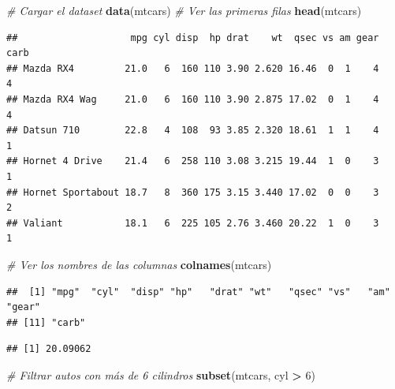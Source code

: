 \documentclass[
]{article}
\newenvironment{Shaded}{\begin{snugshade}}{\end{snugshade}}
\newcommand{\CommentTok}[1]{\textcolor[rgb]{0.56,0.35,0.01}{\textit{#1}}}
\newcommand{\DecValTok}[1]{\textcolor[rgb]{0.00,0.00,0.81}{#1}}
\newcommand{\FunctionTok}[1]{\textcolor[rgb]{0.13,0.29,0.53}{\textbf{#1}}}
\newcommand{\NormalTok}[1]{#1}
\newcommand{\SpecialCharTok}[1]{\textcolor[rgb]{0.81,0.36,0.00}{\textbf{#1}}}
\begin{document}
\begin{Shaded}
\begin{Highlighting}[]
\CommentTok{\# Cargar el dataset}
\FunctionTok{data}\NormalTok{(mtcars)}
\CommentTok{\# Ver las primeras filas}
\FunctionTok{head}\NormalTok{(mtcars)}
\end{Highlighting}
\end{Shaded}

\begin{verbatim}
##                    mpg cyl disp  hp drat    wt  qsec vs am gear carb
## Mazda RX4         21.0   6  160 110 3.90 2.620 16.46  0  1    4    4
## Mazda RX4 Wag     21.0   6  160 110 3.90 2.875 17.02  0  1    4    4
## Datsun 710        22.8   4  108  93 3.85 2.320 18.61  1  1    4    1
## Hornet 4 Drive    21.4   6  258 110 3.08 3.215 19.44  1  0    3    1
## Hornet Sportabout 18.7   8  360 175 3.15 3.440 17.02  0  0    3    2
## Valiant           18.1   6  225 105 2.76 3.460 20.22  1  0    3    1
\end{verbatim}

\begin{Shaded}
\begin{Highlighting}[]
\CommentTok{\# Ver los nombres de las columnas}
\FunctionTok{colnames}\NormalTok{(mtcars)}
\end{Highlighting}
\end{Shaded}

\begin{verbatim}
##  [1] "mpg"  "cyl"  "disp" "hp"   "drat" "wt"   "qsec" "vs"   "am"   "gear"
## [11] "carb"
\end{verbatim}

\begin{Shaded}
\end{Shaded}

\begin{verbatim}
## [1] 20.09062
\end{verbatim}

\begin{Shaded}
\begin{Highlighting}[]
\CommentTok{\# Filtrar autos con más de 6 cilindros}
\FunctionTok{subset}\NormalTok{(mtcars, cyl }\SpecialCharTok{\textgreater{}} \DecValTok{6}\NormalTok{)}
\end{Highlighting}
\end{Shaded}
\end{document}
